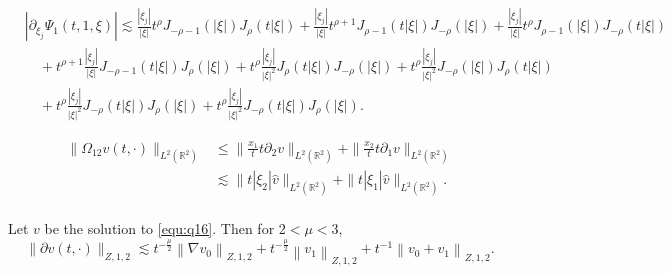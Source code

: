 \documentclass[10pt,a4paper]{amsart}
\newcommand{\R}{\mathbb R}
\newcommand{\f}{\frac}
\newcommand{\p}{\partial}
\begin{document}
\begin{equation}\label{equ:q56}
\begin{aligned}
&|\p_{\xi_j}\Psi_1(t, 1, \xi)|
\lesssim \frac{|\xi_j|}{|\xi|} t^\rho J_{-\rho-1}(|\xi|) J_\rho(t|\xi|)+\frac{|\xi_j|}{|\xi|} t^{\rho+1} J_{\rho-1}(t|\xi|) J_{-\rho}(|\xi|)+\f{|\xi_j|}{|\xi|} t^\rho J_{\rho-1}(|\xi|) J_{-\rho}(t|\xi|)\\
&\quad +t^{\rho+1}\f{|\xi_j|}{|\xi|} J_{-\rho-1}(t|\xi|) J_{\rho}(|\xi|) +t^{\rho}\f{|\xi_j|}{|\xi|^2} J_{\rho}(t|\xi|) J_{-\rho}(|\xi|)+t^\rho\f{|\xi_j|}{|\xi|^2} J_{-\rho}(|\xi|) J_{\rho}(t|\xi|)\\
&\quad +t^{\rho}\f{|\xi_j|}{|\xi|^2} J_{-\rho}(t|\xi|) J_{\rho}(|\xi|)+t^{\rho}\f{|\xi_j|}{|\xi|^2} J_{-\rho}(t|\xi|) J_{\rho}(|\xi|).
\end{aligned}
\end{equation}

\begin{equation}\label{equ:q71}
\begin{aligned}
\|\Omega_{12}v(t, \cdot)\|_{L^2(\R^2)}&\leq \|\f{x_1}{t}t\p_2v\|_{L^2(\R^2)}+\|\f{x_2}{t}t\p_1v\|_{L^2(\R^2)}\\
& \lesssim \|t|\xi_2|\hat{v}\|_{L^2(\R^2)}+\|t|\xi_1|\hat{v}\|_{L^2(\R^2)}.\\
\end{aligned}
\end{equation}

\begin{lemma}\label{lem3}
Let $v$ be the solution to \eqref{equ:q16}. Then for $2<\mu<3$,
\begin{equation}\label{equ:q74}
\|\p v(t, \cdot)\|_{Z, 1, 2} \lesssim t^{-\f{\mu}{2}}\left\|\nabla v_0\right\|_{Z, 1, 2}+t^{-\f{\mu}{2}}\left\| v_1\right\|_{Z, 1, 2}+t^{-1}\left\|v_0+v_1\right\|_{Z, 1,2}.
\end{equation}
\end{lemma}
\end{document}
